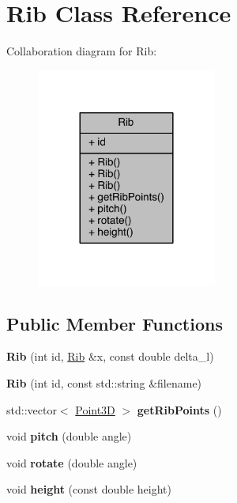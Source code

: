 \hypertarget{class_rib}{}\section{Rib Class Reference}
\label{class_rib}


Collaboration diagram for Rib\+:
\nopagebreak
\begin{figure}[H]
\begin{center}
\leavevmode
\includegraphics[width=168pt]{doxygen/latex/class_rib__coll__graph}
\end{center}
\end{figure}
\subsection*{Public Member Functions}
\begin{DoxyCompactItemize}
\item 
\hypertarget{class_rib_a417cde052770f55f3344d785aef969ef}{}\label{class_rib_a417cde052770f55f3344d785aef969ef} 
{\bfseries Rib} (int id, \hyperlink{class_rib}{Rib} \&x, const double delta\+\_\+l)
\item 
\hypertarget{class_rib_aaaed7a2c960a33e5ac0c510ea7d8881c}{}\label{class_rib_aaaed7a2c960a33e5ac0c510ea7d8881c} 
{\bfseries Rib} (int id, const std\+::string \&filename)
\item 
\hypertarget{class_rib_ae4ea708286531b624f587f22b9416a36}{}\label{class_rib_ae4ea708286531b624f587f22b9416a36} 
std\+::vector$<$ \hyperlink{class_point3_d}{Point3D} $>$ {\bfseries get\+Rib\+Points} ()
\item 
\hypertarget{class_rib_ab6715214f4a43ed51b46a8f42d6f198b}{}\label{class_rib_ab6715214f4a43ed51b46a8f42d6f198b} 
void {\bfseries pitch} (double angle)
\item 
\hypertarget{class_rib_aafef170600416b0e6a86ccb4e8bd4e32}{}\label{class_rib_aafef170600416b0e6a86ccb4e8bd4e32} 
void {\bfseries rotate} (double angle)
\item 
\hypertarget{class_rib_a08859793a4800c7d160d0b494ad39af7}{}\label{class_rib_a08859793a4800c7d160d0b494ad39af7} 
void {\bfseries height} (const double height)
\end{DoxyCompactItemize}
